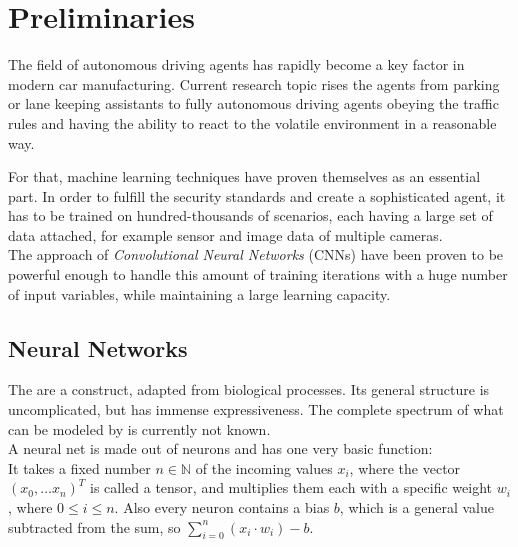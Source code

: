 \chapter{Preliminaries}

The field of autonomous driving agents has rapidly become a key factor in modern car manufacturing. Current research topic rises the agents from parking or lane keeping assistants to fully autonomous driving agents obeying the traffic rules and having the ability to react to the volatile environment in a reasonable way.

For that, machine learning techniques have proven themselves as an essential part. In order to fulfill the security standards and create a sophisticated agent, it has to be trained on hundred-thousands of scenarios, each having a large set of data attached, for example sensor and image data of multiple cameras.\\
The approach of \textit{Convolutional Neural Networks} (CNNs) have been proven to be powerful enough to handle this amount of training iterations with a huge number of input variables, while maintaining a large learning capacity. \cite{krizhevsky2012imagenet}


\section{Neural Networks}\label{sec: NN}

The \nns are a construct, adapted from biological processes. Its general structure is uncomplicated, but has immense expressiveness. The complete spectrum of what can be modeled by \nns is currently not known.\\
A neural net is made out of neurons and has one very basic function:\\
It takes a fixed number $n \in \mathbb{N}$ of the incoming values $x_i$, where the vector $(x_0,\dots x_n)^T$ is called a tensor, and multiplies them each with a specific weight $w_i$, where $0 \le i \le n$.
Also every neuron contains a bias $b$, which is a general value subtracted from the sum, so $\sum_{i=0}^{n} (x_i \cdot w_i) -b$. 

